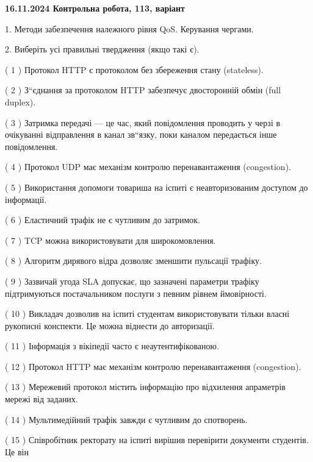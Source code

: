\documentclass[12pt, ukrainian]{article}
\begin{document}
\vspace{4mm}
\newpage
\begin {large}

\textbf{16.11.2024 Контрольна робота, 113, варіант  }\par


{
1. Методи забезпечення належного рівня QoS. Керування чергами.



\vspace{5mm}
2. Виберіть усі правильні твердження (якщо такі є).\par
\vspace{2mm}

( 1 ) Протокол  HTTP є протоколом без збереження стану (stateless).

( 2 ) З“єднання за протоколом  HTTP забезпечує двосторонній обмін (full duplex).

( 3 ) Затримка передачі — це час, який повідомлення проводить у черзі в очікуванні відправлення в канал зв“язку, поки каналом передається інше повідомлення.

( 4 ) Протокол UDP має механізм контролю перенавантаження (congestion).

( 5 ) Використання допомоги товариша на іспиті є неавторизованим доступом до інформації.

( 6 ) Еластичний трафік не є чутливим до затримок.

( 7 ) TCP можна використовувати для широкомовлення.

( 8 ) Алгоритм дирявого відра дозволяє зменшити пульсації трафіку.

( 9 ) Зазвичай угода  SLA допускає, що зазначені параметри трафіку підтримуються постачальником послуги з певним рівнем ймовірності.

( 10 ) Викладач дозволив на іспиті студентам використовувати тільки власні рукописні конспекти. Це можна віднести до авторизації.

( 11 ) Інформація з вікіпедії часто є неаутентифікованою.

( 12 ) Протокол HTTP має механізм контролю перенавантаження (congestion).

( 13 ) Мережевий протокол містить інформацію про відхилення апраметрів мережі від заданих.

( 14 ) Мультимедійний трафік завжди є чутливим до спотворень.

( 15 ) Співробітник ректорату на іспиті вирішив перевірити документи студентів. Це він
}
\end {large}
\end{document}
